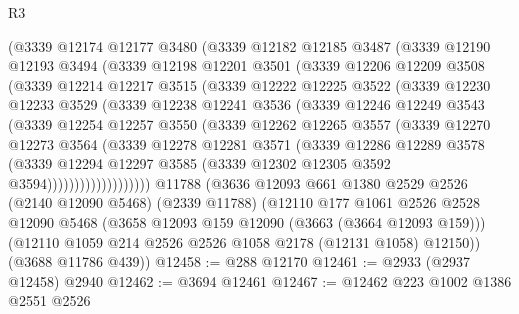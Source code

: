 \begin{lexlean}{R3}
\begin{coremodule}
        (@3339
          @12174
          @12177
          @3480
          (@3339
            @12182
            @12185
            @3487
            (@3339
              @12190
              @12193
              @3494
              (@3339
                @12198
                @12201
                @3501
                (@3339
                  @12206
                  @12209
                  @3508
                  (@3339
                    @12214
                    @12217
                    @3515
                    (@3339
                      @12222
                      @12225
                      @3522
                      (@3339
                        @12230
                        @12233
                        @3529
                        (@3339
                          @12238
                          @12241
                          @3536
                          (@3339
                            @12246
                            @12249
                            @3543
                            (@3339
                              @12254
                              @12257
                              @3550
                              (@3339
                                @12262
                                @12265
                                @3557
                                (@3339
                                  @12270
                                  @12273
                                  @3564
                                  (@3339
                                    @12278
                                    @12281
                                    @3571
                                    (@3339
                                      @12286
                                      @12289
                                      @3578
                                      (@3339
                                        @12294
                                        @12297
                                        @3585
                                        (@3339 @12302 @12305 @3592 @3594)))))))))))))))))))
    @11788
    (@3636
      @12093
      @661
      @1380
      @2529
      @2526
      (@2140 @12090 @5468)
      (@2339 @11788)
      (@12110
        @177
        @1061
        @2526
        @2528
        @12090
        @5468
        (@3658 @12093 @159 @12090 (@3663 (@3664 @12093 @159)))
        (@12110 @1059 @214 @2526 @2526 @1058 @2178 (@12131 @1058) @12150))
      (@3688 @11786 @439))
@12458 := @288 @12170
@12461 := @2933 (@2937 @12458) @2940
@12462 := @3694 @12461
@12467 := @12462 @223 @1002 @1386 @2551 @2526

\end{coremodule}
\end{lexlean}
